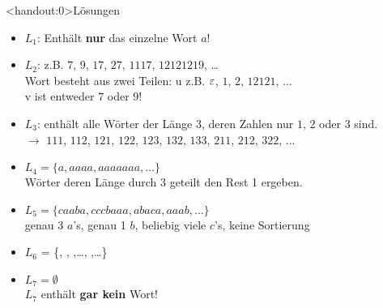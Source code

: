 {
\begin{frame}<handout:0>{Lösungen}
  \begin{itemize}[<+- | alert@+>]
        \item 
            $L_1$: Enthält \textbf{nur} das einzelne Wort $a$!
        \item
            $L_2$: z.B. $7$, $9$, $17$, $27$, $1117$, $12121219$, \dots\\
            Wort besteht aus zwei Teilen: u z.B. $\varepsilon$, $1$, $2$, $12121$, ...\\ v ist entweder $7$ oder $9$!
        \item
            $L_3$: enthält alle Wörter der Länge 3, deren Zahlen nur $1$, $2$ oder $3$ sind.\\
            $\rightarrow$ $111$, $112$, $121$, $122$, $123$, $132$, $133$, $211$, $212$, $322$, ...
        \item
            $L_4 = \{a, aaaa, aaaaaaa, \dots\}$\\
            Wörter deren Länge durch 3 geteilt den Rest 1 ergeben.
        \item
            $L_5 = \{caaba, cccbaaa, abaca, aaab, \dots\}$\\
            genau 3 $a$'s, genau 1 $b$, beliebig viele $c$'s, keine Sortierung
        \item
            $L_6$ = \{\Stopsign, \Rewind \Stopsign, \MoveUp \Stopsign,\dots\;, \MoveDown \Rewind \MoveDown \Stopsign,\dots\}
        \item $L_7 = \emptyset$\\
            $L_7$ enthält \textbf{gar kein} Wort!
    \end{itemize}
\end{frame}
}
